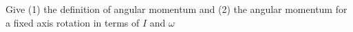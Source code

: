 

\vspace*{\fill}
\centering

Give (1) the definition of angular momentum and (2) the angular momentum for a fixed axis rotation in terms of $I$ and $\omega$

\centering
\vspace*{\fill}

